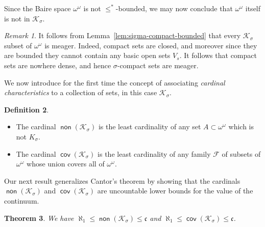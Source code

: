 \documentclass[11pt,oneside,a4paper]{amsbook}
\newcommand{\Ksigma}{\mathcal K_\sigma}
\DeclareMathOperator{\non}{\mathsf{non}}
\DeclareMathOperator{\cov}{\mathsf{cov}}
\theoremstyle{definition}
\theoremstyle{plain}
\newtheorem{theorem}{Theorem}[section]
\theoremstyle{definition}
\newtheorem{definition}[theorem]{Definition}
\theoremstyle{remark}
\newtheorem{remark}[theorem]{Remark}
\numberwithin{equation}{section}
\numberwithin{figure}{section}
\begin{document}
Since the Baire space $\omega^\omega$ is not $\leq^*$-bounded, we may now conclude that $\omega^\omega$ itself is not in $\mathcal K_\sigma$.

\begin{remark}
  \label{rem:ksigma-meager}
  It follows from Lemma~\ref{lem:sigma-compact-bounded} that every $\Ksigma$ subset of $\omega^\omega$ is meager. Indeed, compact sets are closed, and moreover since they are bounded they cannot contain any basic open sets $V_s$. It follows that compact sets are nowhere dense, and hence $\sigma$-compact sets are meager.
\end{remark}


We now introduce for the first time the concept of associating \emph{cardinal characteristics} to a collection of sets, in this case $\mathcal K_\sigma$.

\begin{definition}
  \begin{itemize}
  \item The cardinal $\non(\Ksigma)$ is the least cardinality of any set $A\subset\omega^\omega$ which is not $K_\sigma$.
  \item The cardinal $\cov(\Ksigma)$ is the least cardinality of any family $\mathcal F$ of subsets of $\omega^\omega$ whose union covers all of $\omega^\omega$.
  \end{itemize}
\end{definition}

Our next result generalizes Cantor's theorem by showing that the cardinals $\non(\Ksigma)$ and $\cov(\Ksigma)$ are uncountable lower bounds for the value of the continuum.

\begin{theorem}
  \label{thm:k-sigma}
  We have $\aleph_1\leq\non(\Ksigma)\leq\mathfrak c$ and $\aleph_1\leq\cov(\Ksigma)\leq\mathfrak c$.
\end{theorem}
\end{document}
